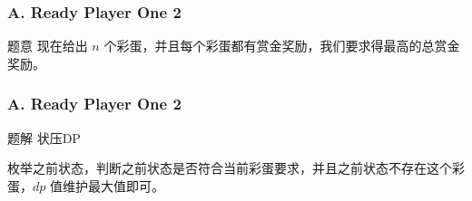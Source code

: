 \renewcommand{\problemname}{A. Ready Player One 2}

\begin{frame}\frametitle{\problemname}
	
	\begin{block}{题意}
		现在给出 $n$ 个彩蛋，并且每个彩蛋都有赏金奖励，我们要求得最高的总赏金奖励。
	\end{block}
\end{frame}

\begin{frame}\frametitle{\problemname}
	
	\begin{block}{题解}
		状压DP
		
		枚举之前状态，判断之前状态是否符合当前彩蛋要求，并且之前状态不存在这个彩蛋，$dp$ 值维护最大值即可。
	\end{block}
\end{frame}